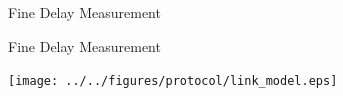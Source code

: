 \documentclass[compress,red]{beamer}
\begin{document}
% 
% 
% 
\logo{}
\begin{frame}{Fine Delay Measurement}


\end{frame}
\begin{frame}{Fine Delay Measurement}

  \begin{center}
  \texttt{[image: ../../figures/protocol/link\_model.eps]}
  \end{center}

\end{frame}
\end{document}
